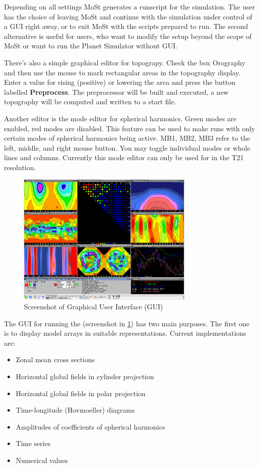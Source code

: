 Depending on all settings
MoSt generates a runscript for the simulation.
The user has the choice of leaving MoSt and
continue with the simulation under control of a GUI
right away, or to exit MoSt with the scripts prepared
to run. The second alternative is useful for users, who
want to modify the setup beyond the scope of MoSt
or want to run the Planet Simulator without GUI.

There's also a simple graphical editor for topograpy.
Check the box Orography and then use the mouse to mark
rectangular areas in the topography display.
Enter a value for rising (positive) or lowering the area
and press the button labelled {\bf Preprocess}.
The preprocessor will be built and executed, a new
topography will be computed and written to a start file.

Another editor is the mode editor for spherical harmonics.
Green modes are enabled, red modes are disabled.
This feature can be used to make runs with only certain
modes of spherical harmonics being active.
MB1, MB2, MB3 refer to the left, middle, and right mouse
button. You may toggle individual modes or whole lines
and columns. Currently this mode editor can only be used
for {\model} in the T21 resolution.

\begin{figure}
   \centering
   \includegraphics[width=8.5cm]{Pics/guisnap}
   \caption[]{Screenshot of Graphical User Interface (GUI)}
   \label{guisnap}
\end{figure}

The GUI for running the {\model}
(screenshot in \ref{guisnap})
has two main purposes. The first one is to display
model arrays in suitable representations.
Current implementations are:
\begin{itemize}
\item{Zonal mean cross sections}
\item{Horizontal global fields in cylinder projection}
\item{Horizontal global fields in polar projection}
\item{Time-longitude (Hovmoeller) diagrams}
\item{Amplitudes of coefficients of spherical harmonics}
\item{Time series}
\item{Numerical values}
\end{itemize}

